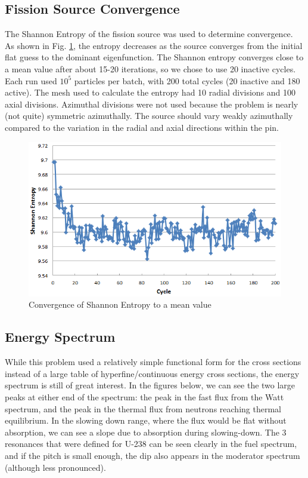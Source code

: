 \subsection{Fission Source Convergence}\label{ss:fissionconv}

The Shannon Entropy of the fission source was used to determine convergence. As shown in Fig. \ref{f:entropy}, the entropy decreases as the source converges from the initial flat guess to the dominant eigenfunction. The Shannon entropy converges close to a mean value after about 15-20 iterations, so we chose to use 20 inactive cycles. Each run used $10^5$ particles per batch, with 200 total cycles (20 inactive and 180 active). The mesh used to calculate the entropy had 10 radial divisions and 100 axial divisions. Azimuthal divisions were not used because the problem is nearly (not quite) symmetric azimuthally. The source should vary weakly azimuthally compared to the variation in the radial and axial directions within the pin.

\begin{figure}[H]
\centering
\includegraphics[width=0.8\linewidth]{images/Entropy.png}
\caption{Convergence of Shannon Entropy to a mean value}
\label{f:entropy}
\end{figure}

\subsection{Energy Spectrum}\label{ss:spectrum}

While this problem used a relatively simple functional form for the cross sections instead of a large table of hyperfine/continuous energy cross sections, the energy spectrum is still of great interest.  In the figures below, we can see the two large peaks at either end of the spectrum: the peak in the fast flux from the Watt spectrum, and the peak in the thermal flux from neutrons reaching thermal equilibrium. In the slowing down range, where the flux would be flat without absorption, we can see a slope due to absorption during slowing-down. The 3 resonances that were defined for U-238 can be seen clearly in the fuel spectrum, and if the pitch is small enough, the dip also appears in the moderator spectrum (although less pronounced). 

